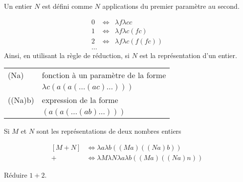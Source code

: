 \begin{mydef}
	Un entier \(N\) est défini comme \(N\) applications du premier paramètre au second.
\end{mydef}
\[\begin{array}{lll}
	0 & \iff & \lambda f \lambda cc \\
	1 & \iff & \lambda f \lambda c (fc)\\
	2 & \iff & \lambda f \lambda c (f(fc))\\
	\ldots & &
\end{array}\]
Ainsi, en utilisant la règle de réduction, si \(N\) est la représentation d'un entier.\\
\begin{center}
	\begin{tabular}{ll}
		(Na) & fonction à un paramètre de la forme\\
		& $\lambda c (a (a (\ldots (ac) \ldots)))$\\
		((Na)b) & expression de la forme \\
		& $(a(a(\ldots(ab)\ldots)))$\\
	\end{tabular}
\end{center}
\begin{myprop}\label{prop:additionlambda}
	Si \(M\) et \(N\) sont les représentations de deux nombres entiers
\end{myprop}
\[\begin{array}{ll}
	[M + N] &\iff \lambda a \lambda b ((Ma) ((Na) b)) \\
	+ & \iff \lambda M \lambda N \lambda a \lambda b ((Ma) ((Na) n))
\end{array}\]
\begin{myexercice}\label{exerc:reduire12}
	Réduire \(1 + 2\).
\end{myexercice}

